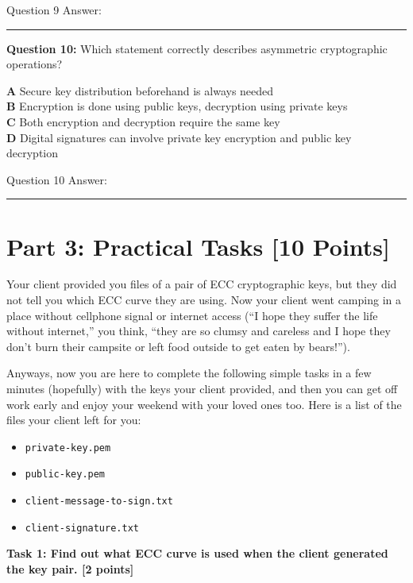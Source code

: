 \documentclass[answer]{exam}  %
\newcommand\FillAnswer[1][]{{\color{blue}\textbf{}}}
\begin{document}
Question 9 Answer: \fbox{\parbox{0.85\textwidth}{
    \FillAnswer{C}
}}

\ifanswer\else
\noindent\rule{\textwidth}{0.5pt}
\textbf{Question 10:} Which statement correctly describes asymmetric cryptographic operations?

\textbf{A} Secure key distribution beforehand is always needed \\
\textbf{B} Encryption is done using public keys, decryption using private keys \\
\textbf{C} Both encryption and decryption require the same key \\
\textbf{D} Digital signatures can involve private key encryption and public key decryption
\fi

Question 10 Answer: \fbox{\parbox{0.85\textwidth}{
    \FillAnswer{B D}
}}

\ifanswer\else
\noindent\rule{\textwidth}{0.5pt}
\fi

\qnewpage

\section*{Part 3: Practical Tasks [10 Points]}

\ifanswer\else

Your client provided you files of a pair of ECC cryptographic keys, but they did not tell you which ECC curve they are using. Now your client went camping in a place without cellphone signal or internet access (``I hope they suffer the life without internet,'' you think, ``they are so clumsy and careless and I hope they don't burn their campsite or left food outside to get eaten by bears!''). 

Anyways, now you are here to complete the following simple tasks in a few minutes (hopefully) with the keys your client provided, and then you can get off work early and enjoy your weekend with your loved ones too. Here is a list of the files your client left for you:

\begin{itemize}
    \item \texttt{private-key.pem}
    \item \texttt{public-key.pem}
    \item \texttt{client-message-to-sign.txt}
    \item \texttt{client-signature.txt}
\end{itemize}

\fi


\textbf{Task 1: Find out what ECC curve is used when the client generated the key pair. [2 points]}
\end{document}
